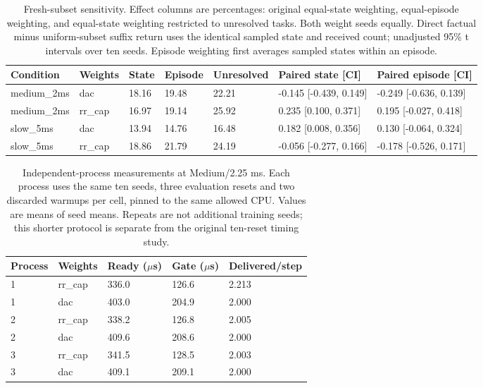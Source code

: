 \begin{table}[!htbp]\centering\scriptsize
\caption{Fresh-subset sensitivity. Effect columns are percentages: original equal-state weighting, equal-episode weighting, and equal-state weighting restricted to unresolved tasks. Both weight seeds equally. Direct factual minus uniform-subset suffix return uses the identical sampled state and received count; unadjusted 95\% t intervals over ten seeds. Episode weighting first averages sampled states within an episode.}\label{tab:robust_strata}
\begin{tabular}{lllllll}\toprule
Condition & Weights & State & Episode & Unresolved & Paired state [CI] & Paired episode [CI]\\\midrule
medium\_2ms & dac & 18.16 & 19.48 & 22.21 & -0.145 [-0.439, 0.149] & -0.249 [-0.636, 0.139]\\
medium\_2ms & rr\_cap & 16.97 & 19.14 & 25.92 & 0.235 [0.100, 0.371] & 0.195 [-0.027, 0.418]\\
slow\_5ms & dac & 13.94 & 14.76 & 16.48 & 0.182 [0.008, 0.356] & 0.130 [-0.064, 0.324]\\
slow\_5ms & rr\_cap & 18.86 & 21.79 & 24.19 & -0.056 [-0.277, 0.166] & -0.178 [-0.526, 0.171]\\
\bottomrule\end{tabular}\end{table}

\begin{table}[!htbp]\centering\scriptsize
\caption{Independent-process measurements at Medium/2.25 ms. Each process uses the same ten seeds, three evaluation resets and two discarded warmups per cell, pinned to the same allowed CPU. Values are means of seed means. Repeats are not additional training seeds; this shorter protocol is separate from the original ten-reset timing study.}\label{tab:robust_cpu}
\begin{tabular}{lllll}\toprule
Process & Weights & Ready ($\mu$s) & Gate ($\mu$s) & Delivered/step\\\midrule
1 & rr\_cap & 336.0 & 126.6 & 2.213\\
1 & dac & 403.0 & 204.9 & 2.000\\
2 & rr\_cap & 338.2 & 126.8 & 2.005\\
2 & dac & 409.6 & 208.6 & 2.000\\
3 & rr\_cap & 341.5 & 128.5 & 2.003\\
3 & dac & 409.1 & 209.1 & 2.000\\
\bottomrule\end{tabular}\end{table}


